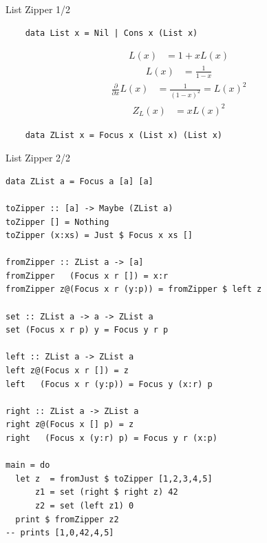 \documentclass[pdf]{beamer}
\begin{document}
\begin{frame}[fragile]{List Zipper 1/2}
  \begin{verbatim}
    data List x = Nil | Cons x (List x)
  \end{verbatim}
  \begin{align*}
    L(x) &= 1 + xL(x)
  \end{align*}
  \begin{align*}
    L(x) &= \frac{1}{1-x}
  \end{align*}
  \begin{align*}
    \frac{\partial}{\partial{x}}L(x) &= \frac{1}{(1-x)^2} = L(x)^2
  \end{align*}
  \begin{align*}
    Z_L(x) &= x L(x)^2
  \end{align*}
  \begin{verbatim}
    data ZList x = Focus x (List x) (List x)
  \end{verbatim}
\end{frame}

\begin{frame}[fragile]{List Zipper 2/2}
  \begin{verbatim}
data ZList a = Focus a [a] [a]

toZipper :: [a] -> Maybe (ZList a)
toZipper [] = Nothing
toZipper (x:xs) = Just $ Focus x xs []

fromZipper :: ZList a -> [a]
fromZipper   (Focus x r []) = x:r
fromZipper z@(Focus x r (y:p)) = fromZipper $ left z

set :: ZList a -> a -> ZList a
set (Focus x r p) y = Focus y r p

left :: ZList a -> ZList a
left z@(Focus x r []) = z
left   (Focus x r (y:p)) = Focus y (x:r) p

right :: ZList a -> ZList a
right z@(Focus x [] p) = z
right   (Focus x (y:r) p) = Focus y r (x:p)

main = do
  let z  = fromJust $ toZipper [1,2,3,4,5]
      z1 = set (right $ right z) 42
      z2 = set (left z1) 0
  print $ fromZipper z2
-- prints [1,0,42,4,5]
  \end{verbatim}
\end{frame}
\end{document}
